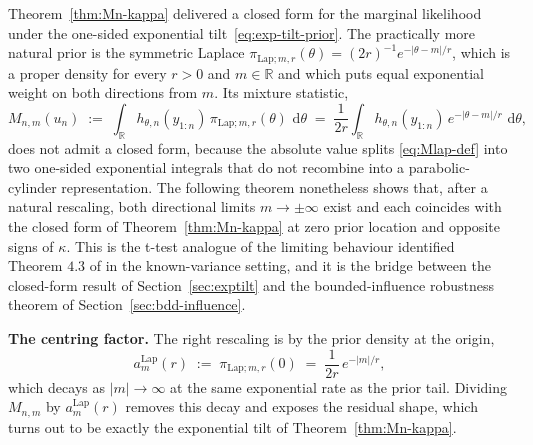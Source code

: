 \documentclass[numsec,webpdf,modern,medium,namedate]{oup-authoring-template}
\theoremstyle{thmstyleone}%
\theoremstyle{thmstyletwo}%
\theoremstyle{thmstylethree}%
\newcommand{\dd}{\,\mathrm{d}}
\newcommand{\Lap}{\mathrm{Lap}}
\newcommand{\1}{\mathbf{1}}
\begin{document}
Theorem~\ref{thm:Mn-kappa} delivered a closed form for the marginal
likelihood under the one-sided exponential tilt~\eqref{eq:exp-tilt-prior}.
The practically more natural prior is the symmetric Laplace
$\pi_{\Lap;m,r}(\theta) = (2r)^{-1}e^{-|\theta-m|/r}$, which is a proper
density for every $r>0$ and $m\in\mathbb{R}$ and which puts equal exponential
weight on both directions from $m$. Its mixture statistic,
\begin{equation}\label{eq:Mlap-def}
  M_{n,m}(u_n)
  \;:=\;\int_\mathbb{R} h_{\theta,n}(y_{1:n})\,
  \pi_{\Lap;m,r}(\theta)\,\dd\theta
  \;=\;\frac{1}{2r}\int_\mathbb{R} h_{\theta,n}(y_{1:n})\,
  e^{-|\theta-m|/r}\,\dd\theta,
\end{equation}
does not admit a closed form, because the absolute value splits \eqref{eq:Mlap-def} into two one-sided exponential integrals that do
not recombine into a parabolic-cylinder representation. The following theorem nonetheless shows that, after a natural rescaling, both directional limits $m\to\pm\infty$ exist and each coincides with
the closed form of Theorem~\ref{thm:Mn-kappa} at zero prior location
and opposite signs of $\kappa$. This is the t-test analogue of the
limiting behaviour identified Theorem $4.3$ of \cite{Cortinovis2025} in the known-variance setting, and it is the bridge between the closed-form result of Section~\ref{sec:exptilt} and the bounded-influence
robustness theorem of Section~\ref{sec:bdd-influence}.

\textbf{The centring factor.} The right rescaling is by the prior density at the origin,
\begin{equation}\label{eq:am-def}
  a_m^{\Lap}(r)
  \;:=\;\pi_{\Lap;m,r}(0)
  \;=\;\frac{1}{2r}\,e^{-|m|/r},
\end{equation}
which decays as $|m|\to\infty$ at the same exponential rate as the
prior tail. Dividing $M_{n,m}$ by $a_m^{\Lap}(r)$ removes this decay
and exposes the residual shape, which turns out to be exactly the
exponential tilt of Theorem~\ref{thm:Mn-kappa}.
\end{document}
